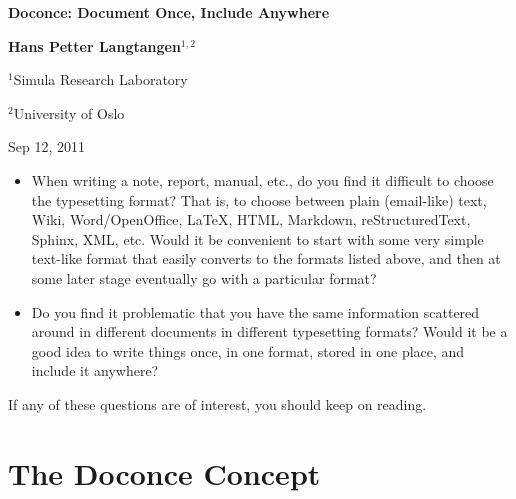 \documentclass{article}
\begin{document}
\begin{center}
{\LARGE\bf Doconce: Document Once, Include Anywhere}
\end{center}



\begin{center}
{\bf Hans Petter Langtangen${}^{1, 2}$} \\ [0mm]
\end{center}

\begin{center}
{\small ${}^1$Simula Research Laboratory} \\ [-1.0mm]
\end{center}

\begin{center}
{\small ${}^2$University of Oslo} \\ [-1.0mm]
\end{center}





\begin{center}
Sep 12, 2011
\end{center}


\begin{itemize}
 \item When writing a note, report, manual, etc., do you find it difficult
   to choose the typesetting format? That is, to choose between plain
   (email-like) text, Wiki, Word/OpenOffice, {\LaTeX}, HTML, Markdown,
   reStructuredText, Sphinx, XML, etc.  Would it be convenient to
   start with some very simple text-like format that easily converts
   to the formats listed above, and then at some later stage eventually go
   with a particular format?

 \item Do you find it problematic that you have the same information
   scattered around in different documents in different typesetting
   formats? Would it be a good idea to write things once, in one format,
   stored in one place, and include it anywhere?
\end{itemize}

\noindent
If any of these questions are of interest, you should keep on reading.


\section{The Doconce Concept}
\end{document}
